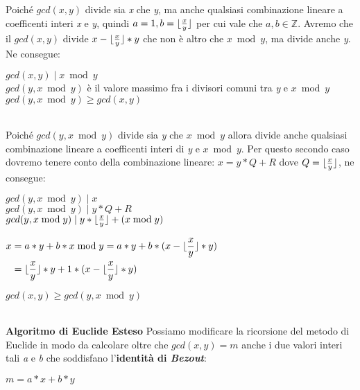 Poiché $gcd(x, y)$ divide sia \textit{x} che \textit{y}, ma anche qualsiasi combinazione lineare a coefficenti interi \textit{x} e \textit{y}, quindi $a = 1, b = \lfloor\frac{x}{y}\rfloor$ per cui vale che $a,b \in \mathbb{Z}$. Avremo che il $gcd(x, y)$ divide $x - \lfloor\frac{x}{y}\rfloor * y$ che non è altro che $x \bmod y$, ma divide anche \textit{y}. Ne consegue:
\begin{center}
    $gcd(x, y)\;|\;x \bmod y$ \\
    $gcd(y, x \bmod y)$ è il valore massimo fra i divisori comuni tra \textit{y} e $x \bmod y$ \\
    $gcd(y, x \bmod y) \geq gcd(x, y)$ 
\end{center}
\   \\
Poiché $gcd(y, x \bmod y)$ divide sia \textit{y} che $x \bmod y$ allora divide anche qualsiasi combinazione lineare a coefficenti interi di \textit{y} e $x \bmod y$. Per questo secondo caso dovremo tenere conto della combinazione lineare: $x = y * Q + R$ dove $Q = \lfloor\frac{x}{y}\rfloor$, ne consegue:
\begin{center}
        $gcd(y, x \bmod y)\;|\; x$  \\
        $gcd(y, x \bmod y)\;|\; y * Q + R$  \\
        $gcd(y, x \bmod y)\;|\; y * \lfloor\frac{x}{y}\rfloor + (x \bmod y)$
\end{center}
\begin{center}
    \begin{math}
        \begin{aligned}
            x& = a * y + b * x \bmod y = a * y + b * (x - \lfloor\frac{x}{y}\rfloor * y) \\
            & = \lfloor\frac{x}{y}\rfloor * y + 1 * (x - \lfloor\frac{x}{y}\rfloor * y)
        \end{aligned}    
    \end{math}
\end{center}
\begin{center}
    $gcd(x, y) \geq gcd(y, x \bmod y) $
\end{center}
\   \\
\textbf{Algoritmo di Euclide Esteso}
\newline
Possiamo modificare la ricorsione del metodo di Euclide in modo da calcolare oltre che $gcd(x, y) = m$ anche i due valori interi tali \textit{a} e \textit{b} che soddisfano l'\textbf{identità di \textit{Bezout}}:
\begin{center}
    $m = a * x + b * y$ \\
\end{center}
